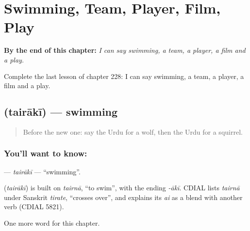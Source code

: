 
\chapter{Swimming, Team, Player, Film, Play}
\label{ch:ur-swimming-team-player-film-play}

\begin{chapteropening}
\textbf{By the end of this chapter:} \emph{I can say swimming, a team, a player, a film and a play.}

Complete the last lesson of chapter 228: I can say swimming, a team, a player, a film and a play.
\end{chapteropening}

\section[\texorpdfstring{\ur{تیراکی} (tairākī)}{تیراکی (tairākī)}]{ (tairākī) — swimming}

\label{lesson:UR-C228-tairaki}



\begin{quote}
Before the new one: say the Urdu for a wolf, then the Urdu for a squirrel.
\end{quote}

\subsection*{You'll want to know: }
\textbf{} — \emph{tairākī} — \textquotedblleft{}swimming\textquotedblright{}.

\begin{cousinweb}
\textbf{} (\emph{tairākī}) is built on \emph{tairnā}, \textquotedblleft{}to swim\textquotedblright{}, with the ending \emph{-ākī}. CDIAL lists \emph{tairnā} under Sanskrit \emph{tirate}, \textquotedblleft{}crosses over\textquotedblright{}, and explains its \emph{ai} as a blend with another verb (CDIAL 5821).
\end{cousinweb}

\begin{grammarlens}[title={What you've built}]
One more word for this chapter.
\end{grammarlens}

